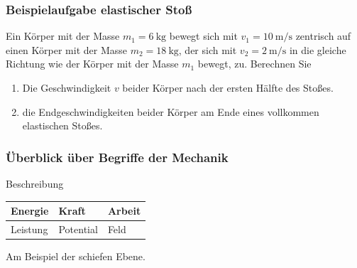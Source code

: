\documentclass{article}
\begin{document}
\frame
{
  \frametitle{Beispielaufgabe elastischer Stoß}
Ein Körper mit der Masse $m_1=\SI{6}{\kilogram}$ bewegt sich mit $v_1=\SI{10}{\meter\per\second}$ zentrisch auf einen Körper mit der Masse $m_2=\SI{18}{\kilogram}$, der sich mit $v_2=\SI{2}{\meter\per\second}$ in die gleiche Richtung wie der Körper mit der Masse $m_1$ bewegt, zu. Berechnen Sie
\begin{enumerate}
\item Die Geschwindigkeit $v$ beider Körper nach der ersten Hälfte des Stoßes.
\item die Endgeschwindigkeiten beider Körper am Ende eines vollkommen elastischen Stoßes.
\end{enumerate}
}

\frame
{
  \frametitle{Überblick über Begriffe der Mechanik}
\begin{block}{Beschreibung}
\vspace{0.5cm}
\begin{tabular}{|>{\centering\arraybackslash}p{3cm}|>{\centering\arraybackslash}p{3cm}|>{\centering\arraybackslash}p{3cm}|}
\hline
\rule[-1ex]{0pt}{2.5ex} Energie & Kraft & Arbeit \\
\hline 
\rule[-1ex]{0pt}{2.5ex} Leistung & Potential & Feld \\ 
\hline 
\end{tabular}
\vspace{0.5cm}
\end{block}
Am Beispiel der schiefen Ebene.
}
\end{document}
